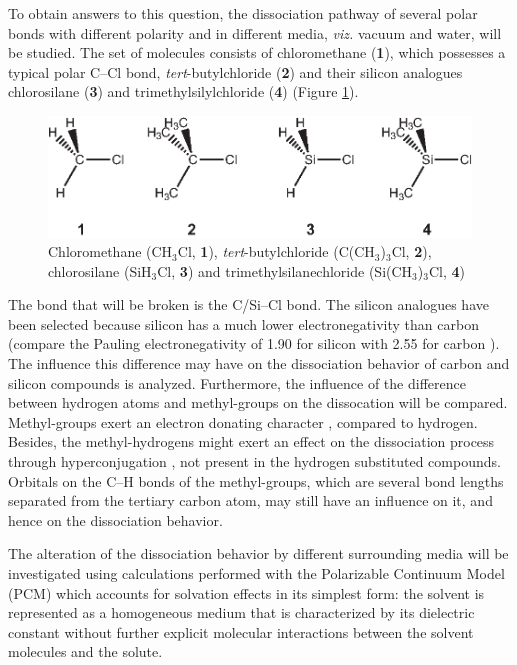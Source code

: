 To obtain answers to this question, the dissociation pathway of several polar bonds with different polarity and in different media, \textit{viz.} vacuum and water, will be studied.  The set of molecules consists of chloromethane (\textbf{1}), which possesses a typical polar C--Cl bond, \textit{tert}-butylchloride (\textbf{2}) and their silicon analogues chlorosilane (\textbf{3}) and trimethylsilylchloride (\textbf{4}) (Figure \ref{ch3.fig.compounds}).  
\begin{figure}[htbp]
\begin{center}
\includegraphics{dissociation/figures/compounds.eps}
\end{center}
\caption{Chloromethane (CH$_3$Cl, \textbf{1}), \textit{tert}-butylchloride
(C(CH$_3$)$_3$Cl, \textbf{2}), chlorosilane (SiH$_3$Cl, \textbf{3}) and trimethylsilanechloride
(Si(CH$_3$)$_3$Cl, \textbf{4})}
\label{ch3.fig.compounds}
\end{figure} 
The bond that will be broken is the C/Si--Cl bond.  The silicon analogues have been selected because silicon has a much lower electronegativity than carbon (compare the Pauling electronegativity of 1.90 for silicon with 2.55 for carbon \cite{handbook}). The influence this difference may have on the dissociation behavior of carbon and silicon compounds is analyzed. Furthermore, the influence of the difference between hydrogen atoms and methyl-groups on the dissocation will be compared. Methyl-groups exert an electron donating character \cite{mcmurry}, compared to hydrogen. Besides, the methyl-hydrogens might exert an effect on the dissociation process through hyperconjugation \cite{march}, not present in the hydrogen substituted compounds. Orbitals on the C--H bonds of the methyl-groups, which are several bond lengths separated from the tertiary carbon atom, may still have an influence on it, and hence on the dissociation behavior. 

The alteration of the dissociation behavior by different surrounding media will be investigated using calculations performed with the Polarizable Continuum Model (PCM) \cite{pcm1,pcm2} which accounts for solvation effects in its simplest form: the solvent is represented as a homogeneous medium that is characterized by its dielectric constant without further explicit molecular interactions between the solvent molecules and the solute. 

